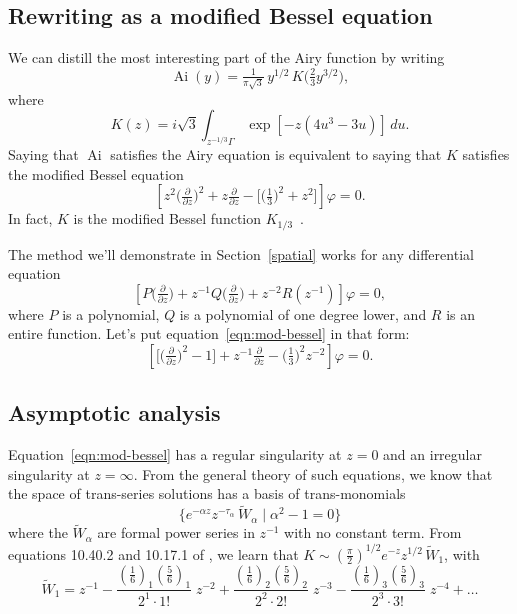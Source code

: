 \documentclass{article}
\theoremstyle{plain}
\newcommand{\series}[1]{\tilde{#1}}
\DeclareMathOperator{\Ai}{Ai}
\begin{document}
\subsection{Rewriting as a modified Bessel equation}
We can distill the most interesting part of the Airy function by writing
\[ \Ai(y) = \tfrac{1}{\pi\sqrt{3}}\,y^{1/2}\,K\big(\tfrac{2}{3} y^{3/2}\big), \]
where
\begin{equation}\label{integral:mod-bessel}
K(z) = i\sqrt{3} \int_{z^{-1/3}\Gamma} \exp\left[-z \left(4u^3 - 3u\right)\right]\,du.
\end{equation}
Saying that $\Ai$ satisfies the Airy equation is equivalent to saying that $K$ satisfies the modified Bessel equation
\begin{equation}\label{eqn:mod-bessel}
\left[z^2 \big(\tfrac{\partial}{\partial z}\big)^2 + z \tfrac{\partial}{\partial z} - \big[\big(\tfrac{1}{3}\big)^2 + z^2\big]\right] \varphi = 0.
\end{equation}
In fact, $K$ is the modified Bessel function $K_{1/3}$~\cite[equation~9.6.1]{dlmf}.

The method we'll demonstrate in Section~\ref{spatial} works for any differential equation
\[ \left[ P\big(\tfrac{\partial}{\partial z}\big) + z^{-1} Q\big(\tfrac{\partial}{\partial z}\big) + z^{-2} R(z^{-1}) \right] \varphi = 0, \]
where $P$ is a polynomial, $Q$ is a polynomial of one degree lower, and $R$ is an entire function. Let's put equation~\ref{eqn:mod-bessel} in that form:
\begin{equation}\label{eqn:reg-mod-bessel}
\left[ \big[ \big(\tfrac{\partial}{\partial z}\big)^2 - 1 \big] + z^{-1} \tfrac{\partial}{\partial z} - \big(\tfrac{1}{3}\big)^2 z^{-2} \right] \varphi = 0.
\end{equation}
\subsection{Asymptotic analysis}
Equation~\ref{eqn:mod-bessel} has a regular singularity at $z = 0$ and an irregular singularity at $z = \infty$. From the general theory of such equations, we know that the space of trans-series solutions has a basis of trans-monomials
\[ \{ e^{-\alpha z} z^{-\tau_\alpha}\,\series{W}_\alpha \mid \alpha^2 - 1 = 0 \} \]
where the $\series{W}_\alpha$ are formal power series in $z^{-1}$ with no constant term. From equations 10.40.2 and 10.17.1 of \cite{dlmf}, we learn that $K \sim \left(\tfrac{\pi}{2}\right)^{1/2} e^{-z} z^{1/2}\,\series{W}_1$, with
\begin{equation}\label{bessel-asymp}
\series{W}_1 = z^{-1} - \frac{(\tfrac{1}{6})_1 (\tfrac{5}{6})_1}{2^1 \cdot 1!}\;z^{-2} + \frac{(\tfrac{1}{6})_2 (\tfrac{5}{6})_2}{2^2 \cdot 2!}\;z^{-3} - \frac{(\tfrac{1}{6})_3 (\tfrac{5}{6})_3}{2^3 \cdot 3!}\;z^{-4} + \ldots
\end{equation}
\end{document}
